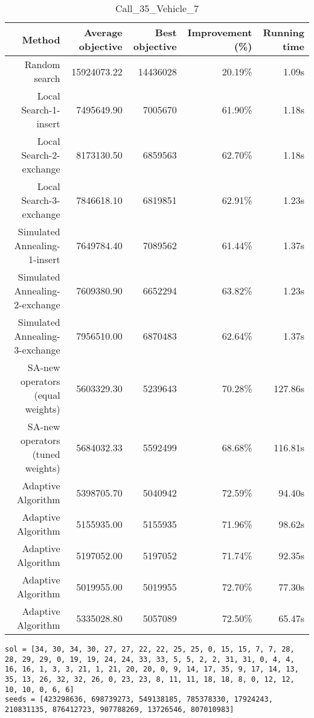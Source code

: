 \begin{table}[ht]
\centering
\caption{Call\_35\_Vehicle\_7}
\label{tab:call35vehicle7}
\begin{tabular}{|r|r|r|r|r|}
Method & Average objective & Best objective & Improvement (\%) & Running time \\
\hline
Random search & 15924073.22 & 14436028 & 20.19\% & 1.09s\\
Local Search-1-insert & 7495649.90 & 7005670 & 61.90\% & 1.18s\\
Local Search-2-exchange & 8173130.50 & 6859563 & 62.70\% & 1.18s\\
Local Search-3-exchange & 7846618.10 & 6819851 & 62.91\% & 1.23s\\
Simulated Annealing-1-insert & 7649784.40 & 7089562 & 61.44\% & 1.37s\\
Simulated Annealing-2-exchange & 7609380.90 & 6652294 & 63.82\% & 1.23s\\
Simulated Annealing-3-exchange & 7956510.00 & 6870483 & 62.64\% & 1.37s\\
SA-new operators (equal weights) & 5603329.30 & 5239643 & 70.28\% & 127.86s\\
SA-new operators (tuned weights) & 5684032.33 & 5592499 & 68.68\% & 116.81s\\
Adaptive Algorithm & 5398705.70 & 5040942 & 72.59\% & 94.40s\\
Adaptive Algorithm & 5155935.00 & 5155935 & 71.96\% & 98.62s\\
Adaptive Algorithm & 5197052.00 & 5197052 & 71.74\% & 92.35s\\
Adaptive Algorithm & 5019955.00 & 5019955 & 72.70\% & 77.30s\\
Adaptive Algorithm & 5335028.80 & 5057089 & 72.50\% & 65.47s\\
\end{tabular}%
\end{table}
\begin{lstlisting}[label={lst:call35vehicle7},caption=Optimal solution call\_35\_vehicle\_7]
sol = [34, 30, 34, 30, 27, 27, 22, 22, 25, 25, 0, 15, 15, 7, 7, 28, 28, 29, 29, 0, 19, 19, 24, 24, 33, 33, 5, 5, 2, 2, 31, 31, 0, 4, 4, 16, 16, 1, 3, 3, 21, 1, 21, 20, 20, 0, 9, 14, 17, 35, 9, 17, 14, 13, 35, 13, 26, 32, 32, 26, 0, 23, 23, 8, 11, 11, 18, 18, 8, 0, 12, 12, 10, 10, 0, 6, 6]
seeds = [423298636, 698739273, 549138185, 785378330, 17924243, 210831135, 876412723, 907788269, 13726546, 807010983]
\end{lstlisting}%
\clearpage


